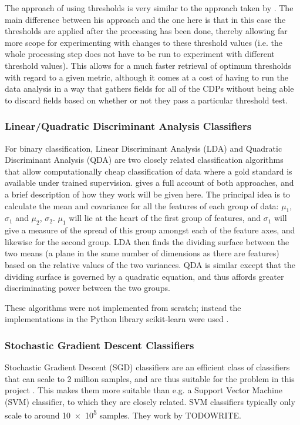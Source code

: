 \documentclass[pdftex,12pt,a4paper]{report}
\begin{document}
The approach of using thresholds is very similar to the approach taken by
\textcite{walsh1997objective}. The main difference between his approach and the one here is that in
this case the thresholds are applied after the processing has been done, thereby allowing far more
scope for experimenting with changes to these threshold values (i.e. the whole processing step does
not have to be run to experiment with different threshold values). This allows for a much faster
retrieval of optimum thresholds with regard to a given metric, although it comes at a cost of having
to run the data analysis in a way that gathers fields for all of the CDPs without being able to
discard fields based on whether or not they pass a particular threshold test.


\subsubsection{Linear/Quadratic Discriminant Analysis Classifiers}

For binary classification, Linear Discriminant Analysis (LDA) and Quadratic Discriminant Analysis
(QDA) are two closely related classification algorithms that allow computationally cheap
classification of data where a gold standard is available under trained supervision.
\textcite{mclachlan2004discriminant} gives a full account of both approaches, and a brief description of how they
work will be given here. The principal idea is to calculate the mean and covariance for all the
features of each group of data: $\mu_1$, $\sigma_1$ and $\mu_2$, $\sigma_2$. $\mu_1$ will lie at the
heart of the first group of features, and $\sigma_1$ will give a measure of the spread of this group
amongst each of the feature axes, and likewise for the second group. LDA then finds the dividing
surface between the two means (a plane in the same number of dimensions as there are features) based
on the relative values of the two variances. QDA is similar except that the dividing surface is
governed by a quadratic equation, and thus affords greater discriminating power between the two
groups.

These algorithms were not implemented from scratch; instead the implementations in the Python
library scikit-learn were used \parencite{scikitLearn2011}.

\subsubsection{Stochastic Gradient Descent Classifiers}
Stochastic Gradient Descent (SGD) classifiers are an efficient class of classifiers that can scale
to 2 million samples, and are thus suitable for the problem in this project
\parencite{singer07pegasos, bottou2008tradeoffs}. This makes them more suitable than e.g. a Support
Vector Machine (SVM) classifier, to which they are closely related. SVM classifiers typically only
scale to around \SI{10e5}{} samples. They work by TODOWRITE.
\end{document}
